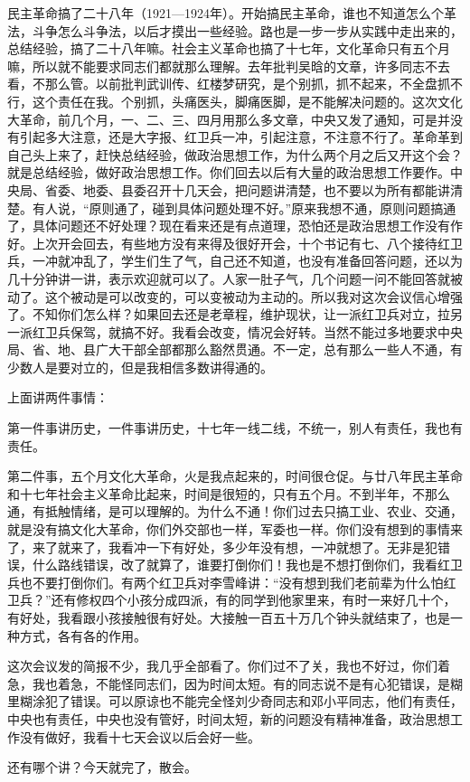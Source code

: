 民主革命搞了二十八年（1921—1924年）。开始搞民主革命，谁也不知道怎么个革法，斗争怎么斗争法，以后才摸出一些经验。路也是一步一步从实践中走出来的，总结经验，搞了二十八年嘛。社会主义革命也搞了十七年，文化革命只有五个月嘛，所以就不能要求同志们都就那么理解。去年批判吴晗的文章，许多同志不去看，不那么管。以前批判武训传、红楼梦研究，是个别抓，抓不起来，不全盘抓不行，这个责任在我。个别抓，头痛医头，脚痛医脚，是不能解决问题的。这次文化大革命，前几个月，一、二、三、四月用那么多文章，中央又发了通知，可是并没有引起多大注意，还是大字报、红卫兵一冲，引起注意，不注意不行了。革命革到自己头上来了，赶快总结经验，做政治思想工作，为什么两个月之后又开这个会？就是总结经验，做好政治思想工作。你们回去以后有大量的政治思想工作要作。中央局、省委、地委、县委召开十几天会，把问题讲清楚，也不要以为所有都能讲清楚。有人说，“原则通了，碰到具体问题处理不好。”原来我想不通，原则问题搞通了，具体问题还不好处理？现在看来还是有点道理，恐怕还是政治思想工作没有作好。上次开会回去，有些地方没有来得及很好开会，十个书记有七、八个接待红卫兵，一冲就冲乱了，学生们生了气，自己还不知道，也没有准备回答问题，还以为几十分钟讲一讲，表示欢迎就可以了。人家一肚子气，几个问题一问不能回答就被动了。这个被动是可以改变的，可以变被动为主动的。所以我对这次会议信心增强了。不知你们怎么样？如果回去还是老章程，维护现状，让一派红卫兵对立，拉另一派红卫兵保驾，就搞不好。我看会改变，情况会好转。当然不能过多地要求中央局、省、地、县广大干部全部都那么豁然贯通。不一定，总有那么一些人不通，有少数人是要对立的，但是我相信多数讲得通的。

上面讲两件事情：

第一件事讲历史，一件事讲历史，十七年一线二线，不统一，别人有责任，我也有责任。

第二件事，五个月文化大革命，火是我点起来的，时间很仓促。与廿八年民主革命和十七年社会主义革命比起来，时间是很短的，只有五个月。不到半年，不那么通，有抵触情绪，是可以理解的。为什么不通！你们过去只搞工业、农业、交通，就是没有搞文化大革命，你们外交部也一样，军委也一样。你们没有想到的事情来了，来了就来了，我看冲一下有好处，多少年没有想，一冲就想了。无非是犯错误，什么路线错误，改了就算了，谁要打倒你们！我也是不想打倒你们，我看红卫兵也不要打倒你们。有两个红卫兵对李雪峰讲：“没有想到我们老前辈为什么怕红卫兵？”还有修权四个小孩分成四派，有的同学到他家里来，有时一来好几十个，有好处，我看跟小孩接触很有好处。大接触一百五十万几个钟头就结束了，也是一种方式，各有各的作用。

这次会议发的简报不少，我几乎全部看了。你们过不了关，我也不好过，你们着急，我也着急，不能怪同志们，因为时间太短。有的同志说不是有心犯错误，是糊里糊涂犯了错误。可以原谅也不能完全怪刘少奇同志和邓小平同志，他们有责任，中央也有责任，中央也没有管好，时间太短，新的问题没有精神准备，政治思想工作没有做好，我看十七天会议以后会好一些。

还有哪个讲？今天就完了，散会。

